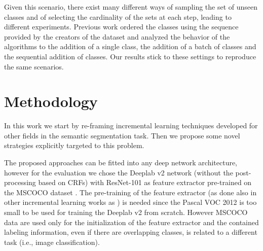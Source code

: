 \documentclass[10pt,twocolumn,letterpaper]{article}
\begin{document}
Given this scenario, there exist many different ways of sampling the set  of unseen classes and of selecting the cardinality of the sets  at each step, leading to different experiments. Previous work \cite{shmelkov2017incremental} ordered the classes using the sequence provided by the creators of the dataset and analyzed the behavior of the algorithms to the addition of a single class, the addition of a batch of classes and the sequential addition of classes. Our results stick to these settings to reproduce the same scenarios.
 \section{Methodology} \label{sec:methodology}


In this work we start by re-framing  incremental learning techniques developed for other fields in the semantic segmentation task. Then we propose some novel strategies explicitly targeted to this problem.


The proposed approaches  can be fitted into any deep network architecture, however for the evaluation we chose the Deeplab v2 network (without the post-processing based on CRFs) with ResNet-101 as feature extractor \cite{chen2018deeplab} pre-trained \cite{nekrasov} on the MSCOCO dataset \cite{lin2014microsoft}.
The pre-training of the feature extractor (as done also in other incremental learning works as \cite{li2018learning}) is needed since the Pascal VOC 2012 is too small to be used for training the Deeplab v2 from scratch. However MSCOCO data are used only for the initialization of the feature extractor and the contained labeling information, even if there are overlapping classes, is related to a different task (i.e., image classification). 
\end{document}
